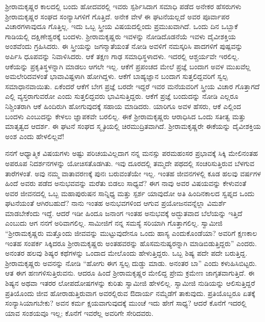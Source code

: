  ಶ‍್ರೀರಾಮಕೃಷ್ಣರ ಕಾಲದಲ್ಲಿ ಬಂದು ಹೋದವರಲ್ಲಿ ಇವರು ಸ್ಪರ್ಶಿಸಿದಾಗ ಸಮಾಧಿ ಪಡೆದ ಅನೇಕರ ಹೆಸರುಗಳು ಶ‍್ರೀರಾಮಕೃಷ್ಣರ ಸಂಘದ ಸಂನ್ಯಾಸಿಗಳಿಗೆ ಗೊತ್ತಿದೆ. ಅನೇಕ ವೇಳೆ ಈ ಘಟನೆಯಲ್ಲದೆ ಅವರ ಪೂರ್ವಾಪರ ವಿಚಾರಗಳಾವುದೂ ಗೊತ್ತಿಲ್ಲ. ಇದು ಒಬ್ಬ ಸ್ತ್ರೀಯ ವಿಷಯದಲ್ಲಿಂದು ಪ್ರಮುಖವಾಗಿದೆ. ಒಂದು ದಿನ ಒಬ್ಬಾಕೆ ಗಾಡಿಯಲ್ಲಿ ದಕ್ಷಿಣೇಶ್ವರಕ್ಕೆ ಬಂದಳು. ಶ‍್ರೀರಾಮಕೃಷ್ಣರು ಇವಳನ್ನು ನೋಡಿದೊಡನೆಯೆ ಇವಳು ದೈವೀಶಕ್ತಿಯ ಅಂಶವೆಂದು ಗ್ರಹಿಸಿದರು. ಈ ಸ್ತ್ರೀಯನ್ನು ಜಗನ್ಮಾತೆಯಂತೆ ನೋಡಿ ಅವಳಿಗೆ ನಮಸ್ಕರಿಸಿ ಪಾದಗಳಿಗೆ ಪುಷ್ಪವನ್ನು ಅರ್ಪಿಸಿ ಧೂಪವನ್ನು ನಿವಾಳಿಸಿದರು. ಆಕೆ ತಕ್ಷಣ ಗಾಢ ಸಮಾಧಿಸ್ಥಳಾದಳು. ಇದರಲ್ಲಿ ಆಶ್ಚರ್ಯವೇ ಇರಲಿಲ್ಲ. ಆಕೆಯನ್ನು ಪ್ರಕೃತಿಸ್ಥಳನ್ನಾಗಿ ಮಾಡಲು ಆಗಲೇ ಇಲ್ಲ. ಆಕೆಗೆ ಪ್ರಪಂಚದ ಮೇಲೆ ಪ್ರಜ್ಞೆ ಬಂದಾಗ ಅವಳ ಮುಖವೆಲ್ಲ ಅಮಲೇರಿದವಳಂತೆ ಭಾವಾವಿಷ್ಟಳಾಗಿ ಹೋಗಿದ್ದಳು. ಆಕೆಗೆ ಬಾಹ್ಯಜ್ಞಾನ ಬಂದಾಗ ಸುತ್ತಲಿದ್ದವರಿಗೆ ಸ್ವಲ್ಪ ಸಮಾಧಾನವಾಯಿತು. ಏಕೆಂದರೆ ಆಕೆಗೆ ಬೇಗ ಪ್ರಜ್ಞೆ ಬರದೇ ಇದ್ದರೆ ಇವರ ಮನೆಯವರಿಗೆ ಸ್ತ್ರೀಯ ವಿಚಾರ ಗೊತ್ತಾಗದೆ ಎಲ್ಲಿ ವ್ಯಸ್ತರಾಗುವರೋ ಎಂದು ಸುತ್ತಲಿದ್ದವರು ಭಾವಿಸುತ್ತಿದ್ದರು. ಆಕೆಗೆ ಪ್ರಜ್ಞೆ ಬಂದುದನ್ನು ನೋಡಿ ಎಲ್ಲರೂ ನಿಶ್ಚಿಂತರಾಗಿ ಆಕೆ ಹಿಂದಿರುಗಿ ಹೋಗುವುದಕ್ಕೆ ಸಹಾಯ ಮಾಡಿದರು. ಯಾರಿಗೂ ಅವಳ ಹೆಸರು, ಆಕೆ ಎಲ್ಲಿಂದ ಬಂದಳು ಎಂಬುದನ್ನು ಕೇಳಲು ಜ್ಞಾಪಕವೇ ಬರಲಿಲ್ಲ. ಈಕೆ ಶ‍್ರೀರಾಮಕೃಷ್ಣರು ಆರಾಧಿಸಿದ ಒಂದು ಸತೀತ್ವ ಮತ್ತು ಮಾತೃತ್ವದ ಆದರ್ಶ. ಈ ಘಟನೆ ಸಂಘದ ಸ್ಮೃತಿಯಲ್ಲಿ ಚಿರಮುದ್ರಿತವಾಗಿದೆ. ಶ‍್ರೀರಾಮಕೃಷ್ಣರೇ ಈಕೆಯನ್ನು ದೈವೀಶಕ್ತಿಯ ಅಂಶ ಎಂದು ಹೇಳಲಿಲ್ಲವೆ! 

 ನನಗೆ ಆಧ್ಯಾತ್ಮಿಕ ವಿಷಯಗಳು ಅಷ್ಟು ಪರಿಚಯವಿಲ್ಲದಾಗ ನನ್ನ ಮನಸ್ಸು ಪರಮಹಂಸರ ಪ್ರಭಾವಕ್ಕೆ ಸಿಕ್ಕಿ ಮೇಲಿನಂತಹ ಅಪರೂಪ ನಿದರ್ಶನಗಳನ್ನು ಯೋಚಿಸತೊಡಗಿತು. ಇವು ದೂರದಲ್ಲಿ ತಮ್ಮದೇ ಪಥದಲ್ಲಿ ಸಂಚರಿಸುತ್ತಿರುವ ಬೆಳಗುವ ತಾರೆಗಳಂತೆ. ಅವು ನಮ್ಮ ವಾತಾವರಣಕ್ಕೆ ಪುನಃ ಬರುವಂತೆಯೇ ಇಲ್ಲ. ಇಂತಹ ಜೀವನಗಳಲ್ಲಿ ಕೂಡ ಹಲವು ವರ್ಷಗಳ ಹಿಂದೆ ಅವರು ಪಡೆದ ಅನುಭವವನ್ನು ಮರೆತು ಬಿಡಲು ಸಾಧ್ಯವೆ? ಈಗ ನಾವು ಅವರ ವಿಷಯವನ್ನು ಕೇಳುವಂತೆ ಅವರ ಜೀವನದಲ್ಲಿ ಒಬ್ಬ ಮಹಾಪುರುಷನ ಸಾನ್ನಿಧ್ಯ ಮತ್ತು ಸ್ಪರ್ಶ ಯಾವುದೋ ಅತಿ ಹಿಂದಿನಕಾಲದ ಸ್ವಪ್ನದ ಒಂದು ಘಟನೆಯಂತೆ ಆಗಿರಬಹುದೆ? ನಾನು ಇಂತಹ ಅನುಭವಗಳಿಂದ ಆಗುವ ಪ್ರಯೋಜನವನ್ನೆಲ್ಲಾ ವಿಮರ್ಶೆ ಮಾಡಬೇಕೆಂದು ಇದ್ದೆ. ಆದರೆ ಇಡೀ ಹಿಂದೂ ಜನಾಂಗ ಇಂತಹ ಅನುಭವಕ್ಕೆ ಅದ್ಭುತವಾದ ಬೆಲೆಯನ್ನು ಇತ್ತಿದೆ ಎಂಬುದು ಆಗ ನನಗೆ ಅರಿವಾಗಲಿಲ್ಲ. ಸಾಮೀಜಿಗೆ ನನ್ನ ಸಮಸ್ಯೆ ಸರಿಯಾಗಿ ಗೊತ್ತಾಗಲಿಲ್ಲ. ಸ್ವಾಮೀಜಿ “ಶ‍್ರೀರಾಮಕೃಷ್ಣರು ಮತ್ತೊಂದು ಜೀವವನ್ನು ಮುಟ್ಟುವುದೇನೂ ಒಂದು ಹಾಸ್ಯ ಎಂದುಕೊಂಡೆಯಾ? ಅವರಿಗೆ ಕ್ಷಣಕಾಲ ಇಂತಹ ಸಂಪರ್ಕ ಸಿಕ್ಕಿದರೂ ಶ‍್ರೀರಾಮಕೃಷ್ಣರು ಅಂತಹವರನ್ನು ಹೊಸಮನುಷ್ಯರನ್ನಾಗಿ ಮಾಡಿಬಿಡುತ್ತಿದ್ದರು” ಎಂದರು. ಅನಂತರ ಹಲವು ಶಿಷ್ಯರ ಕಥೆಗಳನ್ನು ಒಂದಾದ ಮೇಲೊಂದು ಹೇಳುತ್ತಿದ್ದರು. ಒಬ್ಬ ಶಿಷ್ಯ ಪದೇ ಪದೇ ಬರುತ್ತಿದ್ದ. ಶ‍್ರೀರಾಮಕೃಷ್ಣರು ಅವನನ್ನು ನೋಡಿ “ಹೋಗು ಈಗ ಸ್ವಲ್ಪ ದುಡ್ಡು ಮಾಡು. ಅನಂತರ ಬಾ” ಎಂದು ಕಳುಹಿಸಿಬಿಟ್ಟರು. ಆತ ಈಗ ಹಣಗಳಿಸುತ್ತಿರುವನು. ಆದರೂ ಹಿಂದೆ ಶ‍್ರೀರಾಮಕೃಷ್ಣರ ಮೇಲಿದ್ದ ಪ್ರೇಮ ಕ್ರಮೇಣ ಜಾಗೃತವಾಗುತ್ತಿದೆ. ಈ ಶಿಷ್ಯನ ಅಥವಾ ಇತರರ ಲೋಪದೋಷಗಳನ್ನು ಕುರಿತು ಸ್ವಾಮೀಜಿ ಹೇಳಲಿಲ್ಲ. ಸ್ವಾಮೀಜಿ ನುಡಿಯನ್ನು ಆಲಿಸುತ್ತಿದ್ದರೆ ಪ್ರತಿಯೊಂದು ಜೀವ ಹೋರಾಡುತ್ತಿರುವಾಗ ಅವರಲ್ಲಿರುವ ಔದಾರ್ಯ ನಮ್ಮೆಡೆಗೆ ತಾಕುವುದು. ಪ್ರತಿಯೊಬ್ಬರೂ ಏತಕ್ಕೆ ಸಂನ್ಯಾಸಿಯಾಗಬೇಕು? ಅವನ ಕರ್ಮ ಕ್ಷಯವಾಗುವುದಕ್ಕೆ ಮುಂಚೆ ಇದು ಹೇಗೆ ಸಾಧ್ಯ? ಆದರೆ ಕೊನೆಗೆ ಇದರಲ್ಲಿ ಯಾವ ಸಂಶಯವೂ ಇಲ್ಲ; ಕೊನೆಗೆ ಇವರೆಲ್ಲ ಅವರಿಗೇ ಸೇರಿದವರು. 

